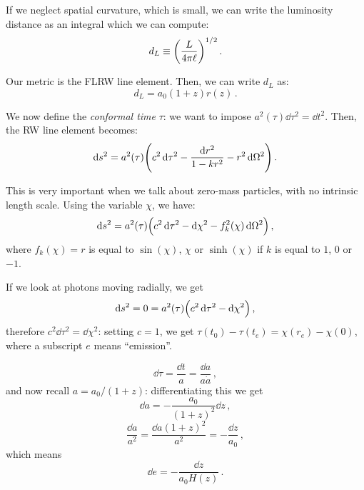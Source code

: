 \documentclass[main.tex]{subfiles}
\begin{document}


If we neglect spatial curvature, which is small, we can write the luminosity distance as an integral which we can compute:
%
\begin{equation}
  d_L \equiv \qty(\frac{L}{4 \pi \ell})^{1/2}
\,.
\end{equation}
%

Our metric is the FLRW line element. Then, we can write \(d_L\) as: 
%
\begin{equation}
  d_L = a_0 (1+z) r(z)
\,.
\end{equation}
%

We now define the \emph{conformal time} \(\tau\): we want to impose \(a^2(\tau ) \dd{\tau^2} = \dd{t^2}  \).
Then, the RW line element becomes: 
%
\begin{equation}
  \dd{s^2} = a^2(\tau ) \qty(c^2 \dd{\tau^2} - \frac{\dd{r^2} }{1 - k r^2} - r^2 \dd{\Omega^2} )
\,.
\end{equation}

This is very important when we talk about zero-mass particles, with no intrinsic length scale.
Using the variable \(\chi\), we have: 
%
\begin{equation}
  \dd{s^2}  = a^2(\tau ) \qty(c^2 \dd{\tau^2} - \dd{\chi^2} - f^2_k (\chi ) \dd{\Omega^2})
\,,
\end{equation}
%
where \(f_k(\chi )=r\) is equal to \(\sin(\chi ) \), \(\chi \) or \(\sinh(\chi )\) if \(k\) is equal to \(1\), \(0\) or \(-1\).

If we look at photons moving radially, we get 
%
\begin{equation}
  \dd{s^2} = 0 = a^2(\tau ) \qty(c^2 \dd{\tau^2} - \dd{\chi^2})
\,,
\end{equation}
%
therefore \(c^2 \dd{\tau^2} = \dd{\chi^2}\): setting \(c=1\), we get \(\tau (t_0 ) - \tau (t_e) = \chi (r_e) - \chi (0)\), where a subscript \(e\) means ``emission''. 

\begin{equation}
  \dd{\tau} = \frac{\dd{t} }{a}  = \frac{\dd{a} }{a \dot{a} }
\,,
\end{equation}
%
and now recall \(a = a_0 /(1+z)\): differentiating this we get
%
\begin{equation}
  \dd{a} = - \frac{a_0 }{(1+z)^2} \dd{z}
\,,
\end{equation}
%
\begin{equation}
  \frac{\dd{a}}{a^2} = \frac{\dd{a} (1+z)^2}{a^2} = - \frac{\dd{z}}{ a_0 }
\,,
\end{equation}
%
which means 
%
\begin{equation}
  \dd{e} = - \frac{\dd{z}}{a_0 H(z)}
  \,.
\end{equation}
\end{document}
